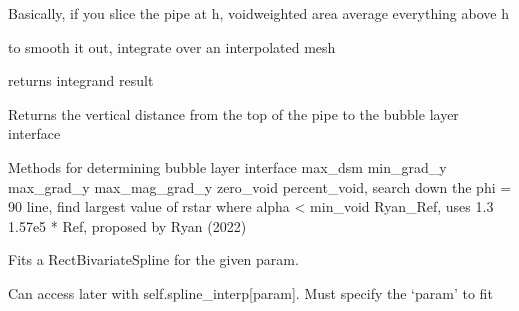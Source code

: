 \documentclass[letterpaper,10pt,english]{sphinxmanual}
\begin{document}
\begin{fulllineitems}
\begin{fulllineitems}
\sphinxAtStartPar
Basically, if you slice the pipe at h, void\sphinxhyphen{}weighted area average everything above h

\sphinxAtStartPar
to smooth it out, integrate over an interpolated mesh

\sphinxAtStartPar
returns integrand result

\end{fulllineitems}


\begin{fulllineitems}
\label{\detokenize{api/MARIGOLD.Condition:MARIGOLD.Condition.find_hstar_pos}}
\pysigstartsignatures
{}
\pysigstopsignatures
\sphinxAtStartPar
Returns the vertical distance from the top of the pipe to the bubble layer interface

\sphinxAtStartPar
Methods for determining bubble layer interface
\sphinxhyphen{} max\_dsm
\sphinxhyphen{} min\_grad\_y
\sphinxhyphen{} max\_grad\_y
\sphinxhyphen{} max\_mag\_grad\_y
\sphinxhyphen{} zero\_void
\sphinxhyphen{} percent\_void, search down the phi = 90 line, find largest value of rstar where alpha \textless{} min\_void
\sphinxhyphen{} Ryan\_Ref, uses 1.3 \sphinxhyphen{} 1.57e\sphinxhyphen{}5 * Ref, proposed by Ryan (2022)

\end{fulllineitems}


\begin{fulllineitems}
\label{\detokenize{api/MARIGOLD.Condition:MARIGOLD.Condition.fit_spline}}
\pysigstartsignatures
{}
\pysigstopsignatures
\sphinxAtStartPar
Fits a RectBivariateSpline for the given param.

\sphinxAtStartPar
Can access later with self.spline\_interp{[}param{]}. Must specify the ‘param’ to fit


\end{fulllineitems}
\end{fulllineitems}
\end{document}
